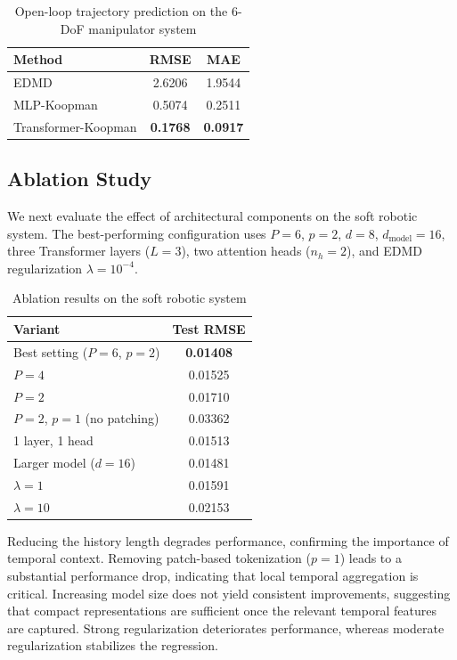 \documentclass[journal]{IEEEtran}
\begin{document}
\begin{table}[!t]
\renewcommand{\arraystretch}{1.2}
\caption{Open-loop trajectory prediction on the 6-DoF manipulator system}
\label{tab:prediction_platform_a}
\centering
\begin{tabular}{lcc}
\toprule
Method & RMSE & MAE \\
\midrule
EDMD & 2.6206 & 1.9544 \\
MLP-Koopman & 0.5074 & 0.2511 \\
Transformer-Koopman & \textbf{0.1768} & \textbf{0.0917} \\
\bottomrule
\end{tabular}
\end{table}

\subsection{Ablation Study}

We next evaluate the effect of architectural components on the soft robotic system. The best-performing configuration uses $P=6$, $p=2$, $d=8$, $d_{\mathrm{model}}=16$, three Transformer layers ($L=3$), two attention heads ($n_h=2$), and EDMD regularization $\lambda=10^{-4}$.

\begin{table}[!t]
\renewcommand{\arraystretch}{1.2}
\caption{Ablation results on the soft robotic system}
\label{tab:ablation_platform_b}
\centering
\begin{tabular}{p{}c}
\toprule
Variant & Test RMSE \\
\midrule
Best setting ($P=6$, $p=2$) & \textbf{0.01408} \\
$P=4$ & 0.01525 \\
$P=2$ & 0.01710 \\
$P=2$, $p=1$ (no patching) & 0.03362 \\
1 layer, 1 head & 0.01513 \\
Larger model ($d=16$) & 0.01481 \\
$\lambda=1$ & 0.01591 \\
$\lambda=10$ & 0.02153 \\
\bottomrule
\end{tabular}
\end{table}

Reducing the history length degrades performance, confirming the importance of temporal context. Removing patch-based tokenization ($p=1$) leads to a substantial performance drop, indicating that local temporal aggregation is critical. Increasing model size does not yield consistent improvements, suggesting that compact representations are sufficient once the relevant temporal features are captured. Strong regularization deteriorates performance, whereas moderate regularization stabilizes the regression.
\end{document}
